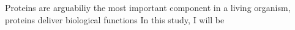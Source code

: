 Proteins are arguabiliy the most important component in a living organism, proteins deliver biological functions   In this study, I will be 